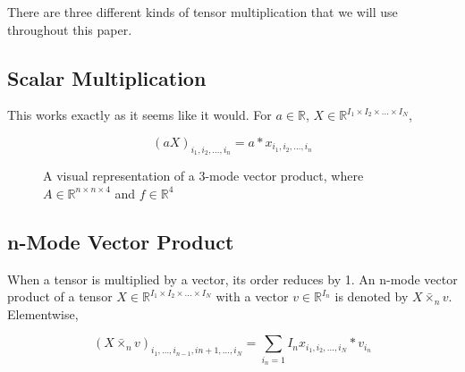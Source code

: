 \documentclass[twocolumn,10pt]{asme2ej}
\begin{document}
There are three different kinds of tensor multiplication that we will use throughout this paper.

\subsection{Scalar Multiplication}

This works exactly as it seems like it would. For $a \in \mathbb{R}$, $X \in \mathbb{R}^{I_1 \times I_2 \times ... \times I_N}$,

\begin{equation}
(aX)_{i_1, i_2, ..., i_n} = a*x_{i_1, i_2, ..., i_n}
\end{equation}

\begin{figure}
\caption{A visual representation of a 3-mode vector product, where $A \in \mathbb{R}^{n \times n \times 4}$ and $f \in \mathbb{R}^{4}$}
\label{fig_ex3.png}
\end{figure}

\subsection{n-Mode Vector Product}

When a tensor is multiplied by a vector, its order reduces by 1. An n-mode vector product of a tensor $X \in \mathbb{R}^{I_1 \times I_2 \times ... \times I_N}$ with a vector $v \in \mathbb{R}^{I_n}$ is denoted by $X \bar{\times}_n v$. Elementwise,

\begin{equation}
(X \bar{\times}_n v )_{i_1, ..., i_{n-1}, i{n+1}, ..., i_N} = \sum_{i_n = 1}{I_n} x_{i_1, i_2, ..., i_N}*v_{i_n}
\end{equation}
\end{document}
